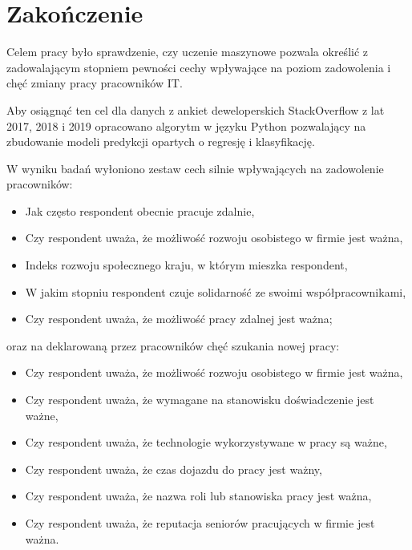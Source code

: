 \chapter*{Zakończenie}\label{ch:ending}

Celem pracy było sprawdzenie, czy uczenie maszynowe pozwala określić z zadowalającym stopniem
pewności cechy wpływające na poziom zadowolenia i chęć zmiany pracy pracowników IT.

Aby osiągnąć ten cel dla danych z ankiet deweloperskich StackOverflow \cite{so-survey-info} z lat 2017, 2018 i 2019
opracowano algorytm w języku Python pozwalający na zbudowanie modeli predykcji opartych o regresję i klasyfikację.

W wyniku badań wyłoniono zestaw cech silnie wpływających na zadowolenie pracowników:

\begin{itemize}
    \item Jak często respondent obecnie pracuje zdalnie,
    \item Czy respondent uważa, że możliwość rozwoju osobistego w firmie jest ważna,
    \item Indeks rozwoju społecznego kraju, w którym mieszka respondent,
    \item W jakim stopniu respondent czuje solidarność ze swoimi współpracownikami,
    \item Czy respondent uważa, że możliwość pracy zdalnej jest ważna;
\end{itemize}

oraz na deklarowaną przez pracowników chęć szukania nowej pracy:

\begin{itemize}
    \item Czy respondent uważa, że możliwość rozwoju osobistego w firmie jest ważna,
    \item Czy respondent uważa, że wymagane na stanowisku doświadczenie jest ważne,
    \item Czy respondent uważa, że technologie wykorzystywane w pracy są ważne,
    \item Czy respondent uważa, że czas dojazdu do pracy jest ważny,
    \item Czy respondent uważa, że nazwa roli lub stanowiska pracy jest ważna,
    \item Czy respondent uważa, że reputacja seniorów pracujących w firmie jest ważna.
\end{itemize}


